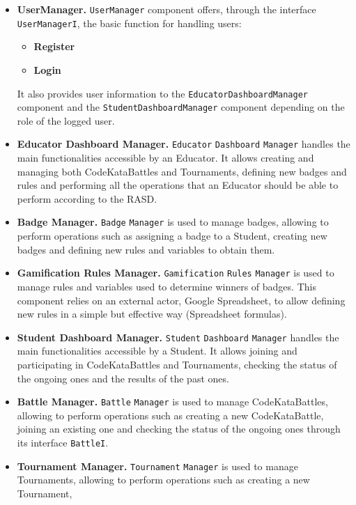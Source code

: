 \begin{itemize}
    \item \textbf{UserManager.} \verb|UserManager| component offers, through the interface \verb|UserManagerI|, the basic function for handling users:
        \begin{itemize}
            \item \textbf{Register}
            \item \textbf{Login}
        \end{itemize}
        It also provides user information to the \verb|EducatorDashboardManager| component and the \verb|StudentDashboardManager| component depending on the role of the logged user.
    \item \textbf{Educator Dashboard Manager.} \verb|Educator| \verb|Dashboard| \verb|Manager| handles the main functionalities accessible by an Educator. 
    It allows creating and managing both CodeKataBattles and Tournaments, defining new badges and rules and performing all the operations that an Educator should be able to perform according to the RASD.
    \item \textbf{Badge Manager.} \verb|Badge| \verb|Manager| is used to manage badges, allowing to perform operations such as assigning a badge to a Student, creating new badges and defining new rules and variables to obtain them.
    \item \textbf{Gamification Rules Manager.} \verb|Gamification| \verb|Rules| \verb|Manager| is used to manage rules and variables used to determine winners of badges. 
    This component relies on an external actor, Google Spreadsheet, to allow defining new rules in a simple but effective way (Spreadsheet formulas).
    \item \textbf{Student Dashboard Manager.} \verb|Student| \verb|Dashboard| \verb|Manager| handles the main functionalities accessible by a Student.
    It allows joining and participating in CodeKataBattles and Tournaments, checking the status of the ongoing ones and the results of the past ones.
    \item \textbf{Battle Manager.} \verb|Battle| \verb|Manager| is used to manage CodeKataBattles, allowing to perform operations such as creating a new CodeKataBattle, 
    joining an existing one and checking the status of the ongoing ones through its interface \verb|BattleI|.
    \item \textbf{Tournament Manager.} \verb|Tournament| \verb|Manager| is used to manage Tournaments, allowing to perform operations such as creating a new Tournament,

\end{itemize}
